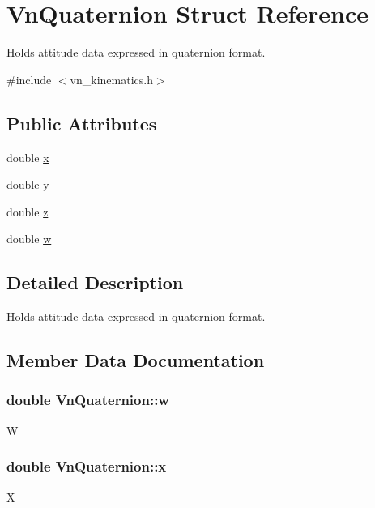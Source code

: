 \hypertarget{structVnQuaternion}{}\section{Vn\+Quaternion Struct Reference}
\label{structVnQuaternion}


Holds attitude data expressed in quaternion format.  




{\ttfamily \#include $<$vn\+\_\+kinematics.\+h$>$}

\subsection*{Public Attributes}
\begin{DoxyCompactItemize}
\item 
double \hyperlink{structVnQuaternion_aaaf720a504c1d466388a655cf9a7543c}{x}
\item 
double \hyperlink{structVnQuaternion_a66810d0f7381549cc242a7ef796a7ece}{y}
\item 
double \hyperlink{structVnQuaternion_aaf1fd55c03d49b64d8d36ae4f0a0e724}{z}
\item 
double \hyperlink{structVnQuaternion_acd1c1241c3fd3f15a7a3f2986ff20e79}{w}
\end{DoxyCompactItemize}


\subsection{Detailed Description}
Holds attitude data expressed in quaternion format. 

\subsection{Member Data Documentation}
\subsubsection[{\texorpdfstring{w}{w}}]{\setlength{\rightskip}{0pt plus 5cm}double Vn\+Quaternion\+::w}\hypertarget{structVnQuaternion_acd1c1241c3fd3f15a7a3f2986ff20e79}{}\label{structVnQuaternion_acd1c1241c3fd3f15a7a3f2986ff20e79}
W 
\subsubsection[{\texorpdfstring{x}{x}}]{\setlength{\rightskip}{0pt plus 5cm}double Vn\+Quaternion\+::x}\hypertarget{structVnQuaternion_aaaf720a504c1d466388a655cf9a7543c}{}\label{structVnQuaternion_aaaf720a504c1d466388a655cf9a7543c}
X 
